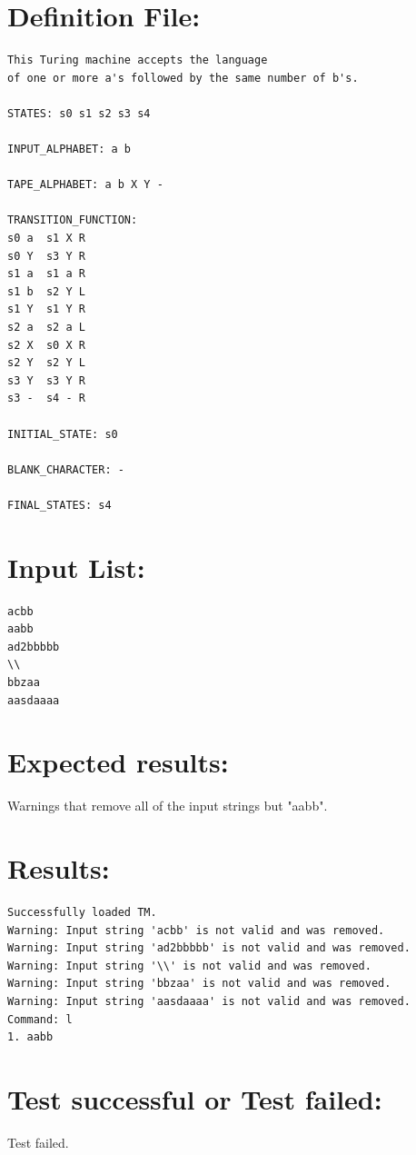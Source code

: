 \documentclass{report}
\begin{document}
\section{Definition File: }
\begin{verbatim}
This Turing machine accepts the language 
of one or more a's followed by the same number of b's.

STATES: s0 s1 s2 s3 s4
	
INPUT_ALPHABET: a b

TAPE_ALPHABET: a b X Y -

TRANSITION_FUNCTION:
s0 a  s1 X R
s0 Y  s3 Y R
s1 a  s1 a R
s1 b  s2 Y L
s1 Y  s1 Y R
s2 a  s2 a L
s2 X  s0 X R
s2 Y  s2 Y L
s3 Y  s3 Y R
s3 -  s4 - R

INITIAL_STATE: s0

BLANK_CHARACTER: -

FINAL_STATES: s4
\end{verbatim}
\section{Input List:} 
\begin{verbatim}
acbb
aabb
ad2bbbbb
\\
bbzaa
aasdaaaa
\end{verbatim}
\section{Expected results:} Warnings that remove all of the input strings but "aabb".
\section{Results:} 

\begin{verbatim}
Successfully loaded TM.
Warning: Input string 'acbb' is not valid and was removed.
Warning: Input string 'ad2bbbbb' is not valid and was removed.
Warning: Input string '\\' is not valid and was removed.
Warning: Input string 'bbzaa' is not valid and was removed.
Warning: Input string 'aasdaaaa' is not valid and was removed.
Command: l
1. aabb
\end{verbatim}

\section{Test successful or Test failed:} Test failed.
\pagebreak
 
\end{document}
